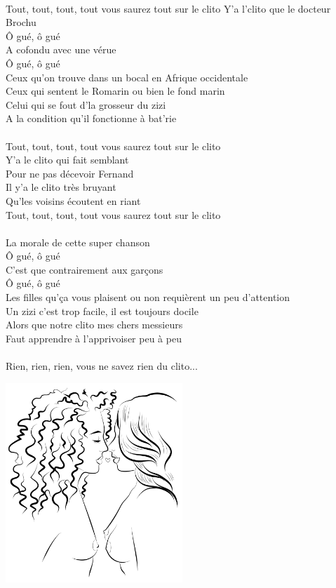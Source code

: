 \\Tout, tout, tout, tout vous saurez tout sur le clito
\breakpage
Y'a l'clito que le docteur Brochu 
\\Ô gué, ô gué
\\A cofondu avec une vérue 
\\Ô gué, ô gué
\\Ceux qu'on trouve dans un bocal en Afrique occidentale
\\Ceux qui sentent le Romarin ou bien le fond marin
\\Celui qui se fout d'la grosseur du zizi
\\A la condition qu'il fonctionne à bat'rie
\\\\Tout, tout, tout, tout vous saurez tout sur le clito
\\Y'a le clito qui fait semblant
\\Pour ne pas décevoir Fernand
\\Il y'a le clito très bruyant
\\Qu'les voisins écoutent en riant
\\Tout, tout, tout, tout vous saurez tout sur le clito
\\\\La morale de cette super chanson 
\\Ô gué, ô gué
\\C'est que contrairement aux garçons 
\\Ô gué, ô gué
\\Les filles qu'ça vous plaisent ou non requièrent un peu
d'attention
\\Un zizi c'est trop facile, il est toujours docile
\\Alors que notre clito mes chers messieurs
\\Faut apprendre à l'apprivoiser peu à peu
\\\\Rien, rien, rien, vous ne savez rien du clito...
\\
\begin{center}
   \includegraphics[width=0.5\textwidth]{images/brev70.png}
\end{center}

\breakpage